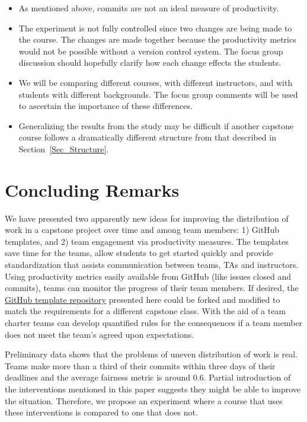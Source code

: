 \documentclass[10pt, conference]{IEEEtran}
\begin{document}
\begin{itemize}
    \item As mentioned above, commits are not an ideal measure of productivity.
    \item The experiment is not fully controlled since two changes are being
    made to the course.  The changes are made together because the productivity
    metrics would not be possible without a version control system. The focus
    group discussion should hopefully clarify how each change effects the
    students.
    \item We will be comparing different courses, with different instructors,
    and with students with different backgrounds. The focus group comments will
    be used to ascertain the importance of these differences.
    \item Generalizing the results from the study may be difficult if another
    capstone course follows a dramatically different structure from that
    described in Section~\ref{Sec_Structure}.
\end{itemize}

\section{Concluding Remarks} \label{SecConclusions}

We have presented two apparently new ideas for improving the distribution of
work in a capstone project over time and among team members: 1) GitHub
templates, and 2) team engagement via productivity measures. The templates save
time for the teams, allow students to get started quickly and provide
standardization that assists communication between teams, TAs and instructors.
Using productivity metrics easily available from GitHub (like issues closed and
commits), teams can monitor the progress of their team members. If desired, the
\href{https://github.com/smiths/capTemplate}{GitHub template repository} presented here could 
be forked and modified to match
the requirements for a different capstone class.  With the aid of a team charter
teams can develop quantified rules for the consequences if a team member does not
meet the team's agreed upon expectations.

Preliminary data shows that the problems of uneven distribution of work is real.
Teams make more than a third of their commits within three days of their
deadlines and the average fairness metric is around 0.6. Partial introduction of
the interventions mentioned in this paper suggests they might be able to improve
the situation.  Therefore, we propose an experiment where a course that uses
these interventions is compared to one that does not.



\end{document}
